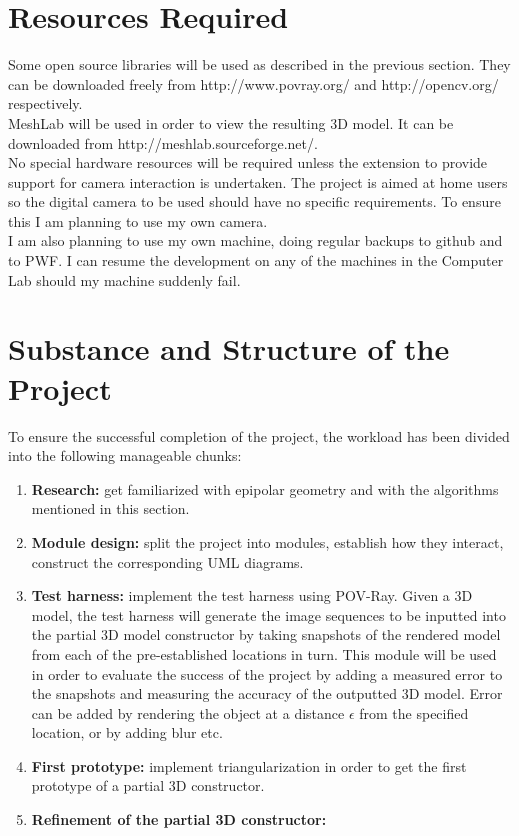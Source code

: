 \section*{Resources Required}
Some open source libraries will be used as described in the previous section. They can be downloaded freely from http://www.povray.org/ and http://opencv.org/ respectively.\\
MeshLab will be used in order to view the resulting 3D model. It can be downloaded from http://meshlab.sourceforge.net/.\\
No special hardware resources will be required unless the extension to provide support for camera interaction is undertaken. The project is aimed at home users so the digital camera to be used should have no specific requirements. To ensure this I am planning to use my own camera.\\

I am also planning to use my own machine, doing regular backups to github and to PWF. I can resume the development on any of the machines in the Computer Lab should my machine suddenly fail. 

\section*{Substance and Structure of the Project}
To ensure the successful completion of the project, the workload has been divided into the following manageable chunks:
\begin{enumerate}
\item {\bf Research:} get familiarized with epipolar geometry and with the algorithms mentioned in this section. 
\item {\bf Module design:} split the project into modules, establish how they interact, construct the corresponding UML diagrams. 
\item {\bf Test harness:} implement the test harness using POV-Ray. Given a 3D model, the test harness will generate the image sequences to be inputted into the partial 3D model constructor by taking snapshots of the rendered model from each of the pre-established locations in turn. This module will be used in order to evaluate the success of the project by adding a measured error to the snapshots and measuring the accuracy of the outputted 3D model. Error can be added by rendering the object at a distance $\epsilon$ from the specified location, or by adding blur etc.
\item {\bf First prototype:} implement triangularization in order to get the first prototype of a partial 3D constructor.
\item {\bf Refinement of the partial 3D constructor:}    
\end{enumerate}


